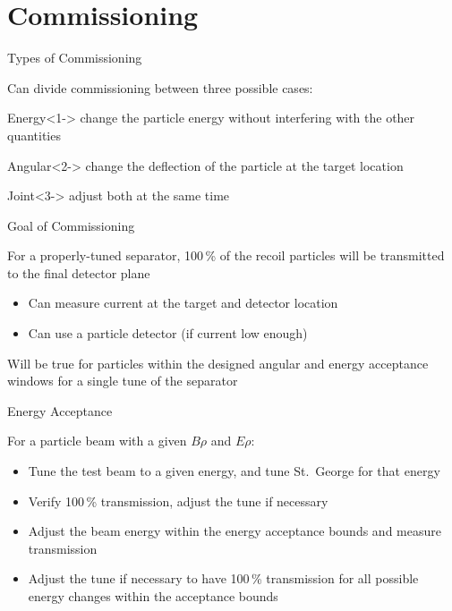 \documentclass[10pt]{beamer}
\begin{document}
\section{Commissioning}

\begin{frame}[fragile]{Types of Commissioning}

    Can divide commissioning between three possible cases:

    \begin{alertblock}{Energy}<1->%
        change the particle energy without interfering with the other
        quantities
    \end{alertblock}
    \begin{alertblock}{Angular}<2->
        change the deflection of the particle at the target location
    \end{alertblock}
    \begin{alertblock}{Joint}<3->
        adjust both at the same time
    \end{alertblock}

\end{frame}

\begin{frame}[fragile]{Goal of Commissioning}

    For a properly-tuned separator, 100\,\% of the recoil particles will
    be transmitted to the final detector plane
    \begin{itemize}
        \item Can measure current at the target and detector location
        \item Can use a particle detector (if current low enough)
    \end{itemize}

    Will be true for particles within the designed angular and energy
    acceptance windows for a single tune of the separator

\end{frame}

\begin{frame}[fragile]{Energy Acceptance}

    For a particle beam with a given $B\rho$ and $E\rho$:

    \begin{itemize}
        \item<1-| alert@1> Tune the test beam to a given energy, and
            tune St.\ George for that energy
        \item<2-| alert@2> Verify 100\,\% transmission, adjust the tune
            if necessary
        \item<3-| alert@3> Adjust the beam energy within the energy
            acceptance bounds and measure transmission
        \item<4-| alert@4> Adjust the tune if necessary to have 100\,\%
            transmission for all possible energy changes within the
            acceptance bounds
    \end{itemize}

\end{frame}
\end{document}
